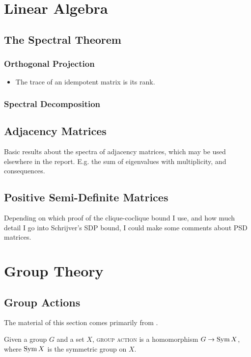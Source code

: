 \documentclass{report}
\begin{document}
\chapter{Linear Algebra}
  \section{The Spectral Theorem}
    \subsection{Orthogonal Projection}
      \begin{itemize}
        \item The trace of an idempotent matrix is its rank.
      \end{itemize}
    \subsection{Spectral Decomposition}

  \section{Adjacency Matrices}
    Basic results about the spectra of adjacency matrices, which may be used
    elsewhere in the report.  E.g. the sum of eigenvalues with multiplicity, and
    consequences.

  \section{Positive Semi-Definite Matrices}
    Depending on which proof of the clique-coclique bound I use, and how much
    detail I go into Schrijver's SDP bound, I could make some comments about PSD
    matrices.

\chapter{Group Theory}
  \section{Group Actions}
    The material of this section comes primarily from \cite[Section~1.7;
    Chapter~4]{dummit-foote}.

    \begin{defn}\label{group-action}
      Given a group $G$ and a set $X$,
      \textsc{group action} is a homomorphism $G \to \operatorname{Sym} X$,
      where $\operatorname{Sym} X$ is the symmetric group on $X$.
    \end{defn}
\end{document}
